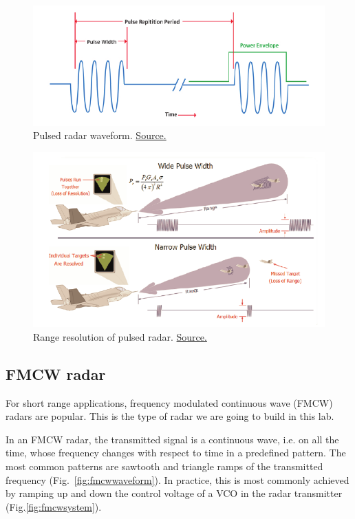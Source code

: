 \documentclass[letterpaper, 11pt]{article}
\begin{document}
\begin{figure}[ht]
	\centering
	\includegraphics{pulsedwaveform}
	\caption{Pulsed radar waveform. \href{http://www.noisecom.com/resource-library/articles/characterizing-radar}{Source.}}
	\label{fig:pulsedwaveform}
\end{figure} 

\begin{figure}[ht]
	\centering
	\includegraphics{pulserangeresolution}
	\caption{Range resolution of pulsed radar. \href{http://www.effectivebits.net/2011/08/radar-analysis-with-tektronix-mdo4104-6.html}{Source.}}
	\label{fig:pulserangeresolution}
\end{figure} 

\subsection{FMCW radar}
For short range applications, frequency modulated continuous wave (FMCW) radars are popular. This is the type of radar we are going to build in this lab.

In an FMCW radar, the transmitted signal is a continuous wave, i.e. on all the time, whose frequency changes with respect to time in a predefined pattern. The most common patterns are sawtooth and triangle ramps of the transmitted frequency (Fig.~\ref{fig:fmcwwaveform}). In practice, this is most commonly achieved by ramping up and down the control voltage of a VCO in the radar transmitter (Fig.\ref{fig:fmcwsystem}). 
\end{document}
